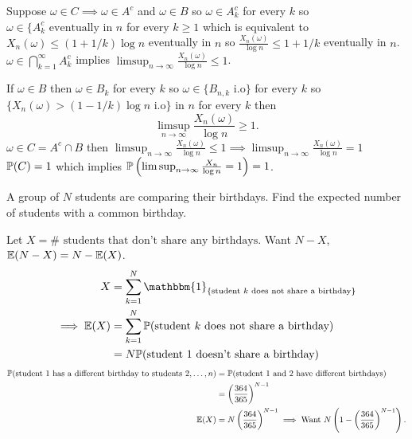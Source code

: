 \documentclass[10pt, a4paper]{article}
\begin{document}
\begin{problem}
\begin{solution}
        Suppose $\omega \in C \implies \omega \in A ^ c$ and $\omega \in B$ so $\omega \in A_{k} ^ c$ for every $k$ so $\omega \in \{A_{k} ^ c\text{ eventually in $n$}$ for every $k \geq 1$ which is equivalent to $X_n(\omega) \leq (1 + 1 / k)\log{n}$ eventually in $n$ so $\frac{X_n(\omega)}{\log{n}} \leq 1 + 1 / k$ eventually in $n$.
        $\omega \in \bigcap_{k = 1}^{\infty}A_k ^ c$ implies $\limsup_{n \to \infty}\frac{X_n(\omega)}{\log{n}} \leq 1$.

        If $\omega \in B$ then $\omega \in B_k$ for every $k$ so $\omega \in \{B_{n, k}\text{ i.o}\}$ for every $k$ so $\{X_{n}(\omega) > (1 - 1 / k)\log{n}\text{ i.o}\}$ in $n$ for every $k$ then
        \[
        \limsup_{n \to \infty}\frac{X_n(\omega)}{\log{n}} \geq 1.
        \]
        $\omega \in C = A ^ c \cap B$ then $\limsup_{n \to \infty}\frac{X_n(\omega)}{\log{n}} \leq 1 \implies \limsup_{n \to \infty}\frac{X_n(\omega)}{\log{n}} = 1$ $\P(C) = 1$ which implies $\P\left(\limsup_{n \to \infty}\frac{X_n}{\log{n}} = 1\right) = 1$.
    \end{solution}
\end{problem}

\begin{problem}
    A group of $N$ students are comparing their birthdays.
    Find the expected number of students with a common birthday.

    \begin{solution}
        Let $X = \#\text{ students that don't share any birthdays}$.
        Want $N - X$,
        $\E(N - X) = N - \E(X)$.
        \begin{align*}
            X &= \sum_{k = 1}^{N}\mathbbm{1}_{\{\text{student $k$ does not share a birthday}\}}  \\
            \implies \E(X) &= \sum_{k = 1}^{N}\P(\text{student $k$ does not share a birthday}) \\
            &= N\P(\text{student $1$ doesn't share a birthday})
        \end{align*}
        \begin{align*}
            \P(\text{student $1$ has a different birthday to students $2, \dotsc, n$}) &= \P(\text{student $1$ and $2$ have different birthdays}) \\
            &= \left(\frac{364}{365}\right) ^ {N - 1} \\
            \E(X) &= N\left(\frac{364}{365}\right) ^ {N - 1} \implies \text{Want } N\left(1 - \left(\frac{364}{365}\right) ^ {N - 1}\right).
        \end{align*}
    \end{solution}
\end{problem}
\end{document}
